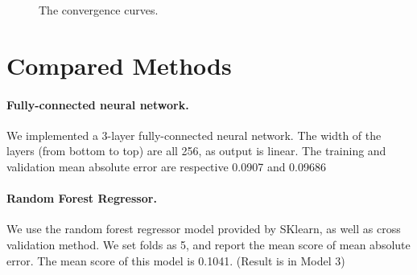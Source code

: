 \documentclass[11pt]{article}
\numberwithin{equation}{section}
\begin{document}
\begin{figure}
	\begin{center}
	\end{center}
	\caption{The convergence curves.}
	\label{fig:convergence}
\end{figure}





\section{Compared Methods}


\paragraph{Fully-connected neural network.}
We implemented a 3-layer fully-connected neural network.
The width of the layers (from bottom to top) are all 256, as output is linear.
The training and validation mean absolute error are respective 0.0907 and 0.09686


\paragraph{Random Forest Regressor.}
We use the random forest regressor model provided by SKlearn, as well as cross validation method. We set folds as 5, and report the mean score of mean absolute error. The mean score of this model is 0.1041. (Result is in Model 3)
\end{document}
